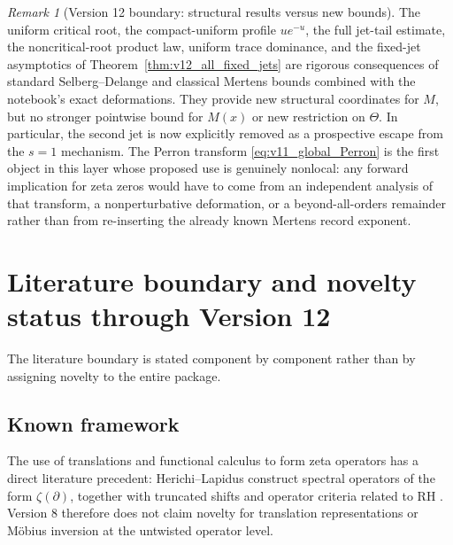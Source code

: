 \documentclass[11pt]{amsart}
\numberwithin{equation}{section}
\theoremstyle{plain}
\theoremstyle{definition}
\theoremstyle{remark}
\newtheorem{remark}[theorem]{Remark}
\begin{document}
\begin{remark}[Version 12 boundary: structural results versus new bounds]
\label{rem:v11_boundary}
The uniform critical root, the compact-uniform profile \(ue^{-u}\), the full
jet-tail estimate, the noncritical-root product law, uniform trace dominance,
and the fixed-jet asymptotics of Theorem~\ref{thm:v12_all_fixed_jets} are
rigorous consequences of standard Selberg--Delange and classical Mertens
bounds combined with the notebook's exact deformations.  They provide new
structural coordinates for \(M\), but no stronger pointwise bound for
\(M(x)\) or new restriction on \(\Theta\).  In particular, the second jet is
now explicitly removed as a prospective escape from the \(s=1\) mechanism.
The Perron transform \eqref{eq:v11_global_Perron} is the first object in this
layer whose proposed use is genuinely nonlocal: any forward implication for
zeta zeros would have to come from an independent analysis of that transform,
a nonperturbative deformation, or a beyond-all-orders remainder rather than
from re-inserting the already known Mertens record exponent.
\end{remark}


\section{Literature boundary and novelty status through Version 12}
\label{sec:status_classification}

The literature boundary is stated component by component rather than by
assigning novelty to the entire package.

\subsection{Known framework}
\label{subsec:known_framework}

The use of translations and functional calculus to form zeta operators has a
direct literature precedent: Herichi--Lapidus construct spectral operators of
the form \(\zeta(\partial)\), together with truncated shifts and operator
criteria related to RH \cite{HerichiLapidus2014}.  Version 8 therefore does
not claim novelty for translation representations or M\"obius inversion at
the untwisted operator level.
\end{document}
